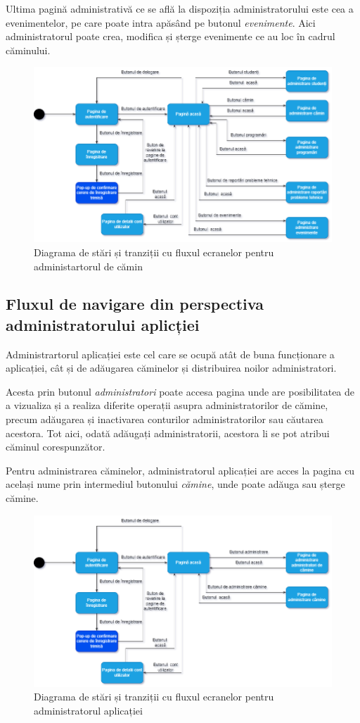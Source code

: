 \documentclass[12pt,a4paper]{report}
\theoremstyle{definition}
\theoremstyle{remark}
\begin{document}
\par Ultima pagină administrativă ce se află la dispoziția administratorului este cea a evenimentelor, pe care poate intra apăsând pe butonul {\itshape evenimente}. Aici administratorul poate crea, modifica și șterge evenimente ce au loc în cadrul căminului.

\begin{figure}[H]
    \centering
    \includegraphics[width=0.75\linewidth]{resurse/diagrame/diagrama_de_navigare.2drawio.png}
    \caption{Diagrama de stări și tranziții cu fluxul ecranelor pentru administartorul de cămin}
\end{figure}

\subsection{Fluxul de navigare din perspectiva administratorului aplicției}
\par Administrartorul aplicației este cel care se ocupă atât de buna funcționare a aplicației, cât și de adăugarea căminelor și distribuirea noilor administratori.

\par Acesta prin butonul  {\itshape administratori} poate accesa pagina unde are posibilitatea de a vizualiza și  a realiza diferite operații asupra administratorilor de cămine, precum adăugarea și inactivarea conturilor administratorilor sau căutarea acestora. Tot aici, odată adăugați administratorii, acestora li se pot atribui căminul corespunzător.

\par Pentru administrarea căminelor, administratorul aplicației are acces la pagina cu același nume prin intermediul butonului {\itshape cămine}, unde poate adăuga sau șterge cămine.

\begin{figure}[H]
    \centering
    \includegraphics[width=0.75\linewidth]{resurse/diagrame/diagrama_de_navigare3.drawio.png}
    \caption{Diagrama de stări și tranziții cu fluxul ecranelor pentru administratorul aplicației}
\end{figure}
\end{document}
